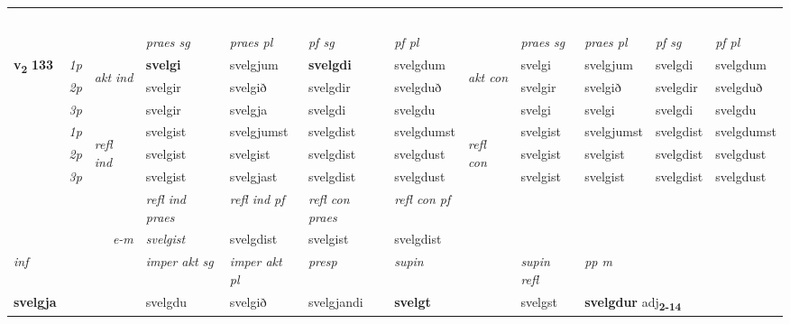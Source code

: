 \begin{longtable}[l]{X>{\footnotesize\itshape}llXXXXlXXXX}
\midrule
 & \\*
  & \\*
   & \\*
   & \\*
  & \\
   \midrule
 & &   & \textit{praes sg}  & \textit{praes pl}    & \textit{ pf sg} & \textit{pf pl} & & \textit{praes sg}  & \textit{praes pl}    & \textit{pf sg} & \textit{pf pl }  \\ \cmidrule{4-7} \cmidrule{9-12}
 \multirow{2}{*}{{{\textbf{v{\textsubscript{2}}} \Large{\textbf{133}}}}}  & 1p & \multirow{3}{*}{\begin{turn}{90}\textit{akt ind}\end{turn}} & \textbf{svelgi} & svelgjum & \textbf{svelgdi} & svelgdum & \multirow{3}{*}{\begin{turn}{90}\textit{akt con}\end{turn}} &svelgi & svelgjum & svelgdi & svelgdum\\*
 & 2p &  &  svelgir  & svelgið & svelgdir & svelgduð & & svelgir & svelgið & svelgdir & svelgduð \\*
 & 3p &  & svelgir & svelgja & svelgdi & svelgdu & & svelgi & svelgi& svelgdi & svelgdu \\*
\cmidrule{4-7} \cmidrule{9-12}
 & 1p & \multirow{3}{*}{\begin{turn}{90}\textit{refl ind}\end{turn}}  & svelgist & svelgjumst & svelgdist & svelgdumst & \multirow{3}{*}{\begin{turn}{90}\textit{refl con}\end{turn}}  &svelgist & svelgjumst & svelgdist & svelgdumst \\*
 & 2p &  & svelgist & svelgist & svelgdist & svelgdust & &svelgist & svelgist & svelgdist & svelgdust \\*
 & 3p  & & svelgist & svelgjast & svelgdist & svelgdust & & svelgist & svelgist& svelgdist & svelgdust \\*
\cmidrule{4-7} \cmidrule{9-12}

 & && \textit{refl ind praes} & \textit{refl ind pf} & \textit{refl con praes} & \textit{refl con pf} \\*
\multicolumn{3}{r}{\textit{e-m}}& svelgist & svelgdist & svelgist & svelgdist \\*

\cmidrule{4-7}
   {\textit{inf}} & &  & \textit{imper akt sg} & \textit{imper akt pl}   & \textit{presp} & \textit{supin} && \textit{supin refl} & \textit{pp m} \\*
  {\textbf{svelgja}} & && svelgdu  & svelgið   & svelgjandi &  \textbf{svelgt} && svelgst & \multicolumn{2}{l}{\textbf{svelgdur} adj\textbf{\textsubscript{2-14}}} \\*


\end{longtable}
